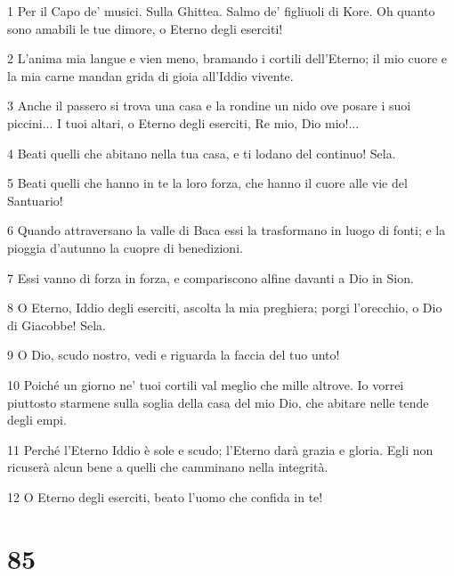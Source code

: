 \par 1 Per il Capo de' musici. Sulla Ghittea. Salmo de' figliuoli di Kore. Oh quanto sono amabili le tue dimore, o Eterno degli eserciti!
\par 2 L'anima mia langue e vien meno, bramando i cortili dell'Eterno; il mio cuore e la mia carne mandan grida di gioia all'Iddio vivente.
\par 3 Anche il passero si trova una casa e la rondine un nido ove posare i suoi piccini... I tuoi altari, o Eterno degli eserciti, Re mio, Dio mio!...
\par 4 Beati quelli che abitano nella tua casa, e ti lodano del continuo! Sela.
\par 5 Beati quelli che hanno in te la loro forza, che hanno il cuore alle vie del Santuario!
\par 6 Quando attraversano la valle di Baca essi la trasformano in luogo di fonti; e la pioggia d'autunno la cuopre di benedizioni.
\par 7 Essi vanno di forza in forza, e compariscono alfine davanti a Dio in Sion.
\par 8 O Eterno, Iddio degli eserciti, ascolta la mia preghiera; porgi l'orecchio, o Dio di Giacobbe! Sela.
\par 9 O Dio, scudo nostro, vedi e riguarda la faccia del tuo unto!
\par 10 Poiché un giorno ne' tuoi cortili val meglio che mille altrove. Io vorrei piuttosto starmene sulla soglia della casa del mio Dio, che abitare nelle tende degli empi.
\par 11 Perché l'Eterno Iddio è sole e scudo; l'Eterno darà grazia e gloria. Egli non ricuserà alcun bene a quelli che camminano nella integrità.
\par 12 O Eterno degli eserciti, beato l'uomo che confida in te!

\chapter{85}

